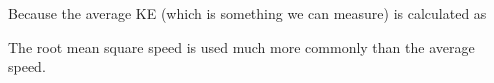 \documentclass[class=article, crop=false, 12pt]{standalone}
\begin{document}
Because the average KE (which is something we can measure) is calculated as 

The root mean square speed is used much more commonly than the average speed.

\theend
\end{document}
